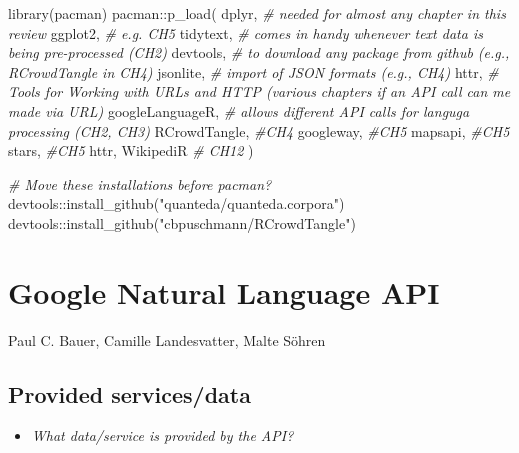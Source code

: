 \documentclass[
]{book}
\newenvironment{Shaded}{\begin{snugshade}}{\end{snugshade}}
\newcommand{\CommentTok}[1]{\textcolor[rgb]{0.56,0.35,0.01}{\textit{#1}}}
\newcommand{\FunctionTok}[1]{\textcolor[rgb]{0.00,0.00,0.00}{#1}}
\newcommand{\NormalTok}[1]{#1}
\newcommand{\SpecialCharTok}[1]{\textcolor[rgb]{0.00,0.00,0.00}{#1}}
\newcommand{\StringTok}[1]{\textcolor[rgb]{0.31,0.60,0.02}{#1}}
\providecommand{\tightlist}{%
  \setlength{\itemsep}{0pt}\setlength{\parskip}{0pt}}
\begin{document}
\begin{Shaded}
\begin{Highlighting}[]
\FunctionTok{library}\NormalTok{(pacman)}
\NormalTok{pacman}\SpecialCharTok{::}\FunctionTok{p\_load}\NormalTok{(}
\NormalTok{  dplyr, }\CommentTok{\# needed for almost any chapter in this review}
\NormalTok{  ggplot2, }\CommentTok{\# e.g. CH5}
\NormalTok{  tidytext, }\CommentTok{\# comes in handy whenever text data is being pre{-}processed (CH2)}
\NormalTok{  devtools, }\CommentTok{\# to download any package from github (e.g., RCrowdTangle in CH4)}
\NormalTok{  jsonlite, }\CommentTok{\# import of JSON formats (e.g., CH4)}
\NormalTok{  httr, }\CommentTok{\# Tools for Working with URLs and HTTP (various chapters if an API call can me made via URL)}
\NormalTok{  googleLanguageR, }\CommentTok{\# allows different API calls for languga processing (CH2, CH3)}
\NormalTok{  RCrowdTangle, }\CommentTok{\#CH4}
\NormalTok{  googleway, }\CommentTok{\#CH5}
\NormalTok{  mapsapi, }\CommentTok{\#CH5}
\NormalTok{  stars, }\CommentTok{\#CH5}
\NormalTok{  httr,}
\NormalTok{  WikipediR }\CommentTok{\# CH12}
\NormalTok{)}

\CommentTok{\# Move these installations before pacman?}
\NormalTok{devtools}\SpecialCharTok{::}\FunctionTok{install\_github}\NormalTok{(}\StringTok{"quanteda/quanteda.corpora"}\NormalTok{)}
\NormalTok{devtools}\SpecialCharTok{::}\FunctionTok{install\_github}\NormalTok{(}\StringTok{"cbpuschmann/RCrowdTangle"}\NormalTok{)}
\end{Highlighting}
\end{Shaded}

\hypertarget{google-natural-language-api}{%
\chapter{Google Natural Language API}\label{google-natural-language-api}}

Paul C. Bauer, Camille Landesvatter, Malte Söhren

\hypertarget{provided-servicesdata}{%
\section{Provided services/data}\label{provided-servicesdata}}

\begin{itemize}
\tightlist
\item
  \emph{What data/service is provided by the API?}
\end{itemize}
\end{document}
